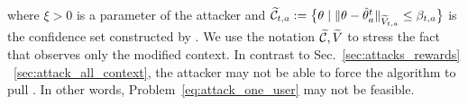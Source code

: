 where $\xi>0$ is a parameter of the attacker and $\widetilde{\mathcal{C}}_{t,a} := \big\{\theta \mid \|\theta - \hat{\theta}_{a}^t\|_{\widetilde{V}_{t,a}} \leq \beta_{t,a} \big\}$ is the confidence set constructed by \linucb. We use the notation $\widetilde{\mathcal{C}}, \widetilde{V}$ to stress the fact that \linucb observes only the modified context.
%
%
%
In contrast to Sec.~\ref{sec:attacks_rewards} ~\ref{sec:attack_all_context}, the attacker may not be able to force the algorithm to pull . In other words, Problem~\ref{eq:attack_one_user} may not be feasible. 
